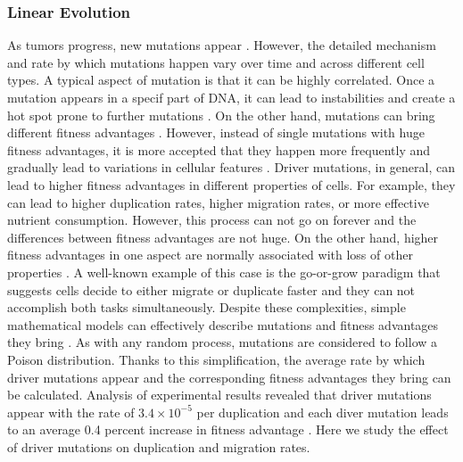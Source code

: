 \documentclass[aps,prl, superscriptaddress,groupedaddress]{revtex4}  %
\begin{document}
	\subsubsection{Linear Evolution} 
	 As tumors progress, new mutations appear \cite{hanahan2011hallmarks}. However, the detailed mechanism and rate by which mutations happen vary over time and across different cell types. A typical aspect of mutation is that it can be highly correlated. Once a mutation appears in a specif part of DNA, it can lead to instabilities and create a hot spot prone to further mutations \cite{nesta2020hotspots}. On the other hand, mutations can bring different fitness advantages \cite{vermeulen2013defining, mcfarland2014tug}. However, instead of single mutations with huge fitness advantages, it is more accepted that they happen more frequently and gradually lead to variations in cellular features \cite{castro2015mini}. Driver mutations, in general, can lead to higher fitness advantages in different properties of cells. For example, they can lead to higher duplication rates, higher migration rates, or more effective nutrient consumption. However, this process can not go on forever and the differences between fitness advantages are not huge. On the other hand, higher fitness advantages in one aspect are normally associated with loss of other properties \cite{persi2020mutation, hausser2020tumour}. A well-known example of this case is the go-or-grow paradigm \cite{hatzikirou2012go} that suggests cells decide to either migrate or duplicate faster and they can not accomplish both tasks simultaneously. Despite these complexities, simple mathematical models can effectively describe mutations and fitness advantages they bring \cite{waclaw2015spatial, paterson2020mathematical}. As with any random process, mutations are considered to follow a Poison distribution. Thanks to this simplification, the average rate by which driver mutations appear and the corresponding fitness advantages they bring can be calculated. Analysis of experimental results revealed that driver mutations appear with the rate of $3.4\times 10^{-5}$ per duplication and each diver mutation leads to an average 0.4 percent increase in fitness advantage \cite{bozic2010accumulation}. Here we study the effect of driver mutations on duplication and migration rates.   
	
\end{document}
